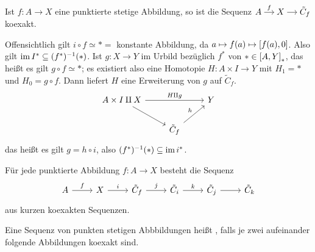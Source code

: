 \begin{satz}
	Ist $f \colon A \to X$ eine punktierte stetige Abbildung, so ist die Sequenz \(
		\begin{tikzcd}[sep=small,cramped]
			A \rar["f"] & X \rar & \tilde{C}_f
		\end{tikzcd}
	\) koexakt.
\end{satz}
\begin{beweis}
	Offensichtlich gilt $i \circ f \simeq * =$ konstante Abbildung, da $a \mapsto f(a) \mapsto \benbrace*{f(a),0}$.
	Also gilt $\im I^* \subseteq (f^*)^{-1}(*)$.
	Ist $g \colon X \to Y$ im Urbild bezüglich $f^*$ von $* \in \benbrace*{A,Y}_*$, das heißt es gilt $g \circ f \simeq *$; es existiert also eine Homotopie $H \colon A \times I \to Y$ mit $H_1 = *$ und $H_0= g \circ f$.
	Dann liefert $H$ eine Erweiterung von $g$ auf $\tilde{C}_f$.
	\[
		\begin{tikzcd}
			A \times I \amalg X \ar[rr,"H \amalg g"] \drar & & Y \\
			& \tilde{C}_f \urar["h"]
		\end{tikzcd}
	\]
	das heißt es gilt $g = h \circ i$, also $(f^*)^{-1}(*) \subseteq \im i^*$.
\end{beweis}

\begin{korollar}
	Für jede punktierte Abbildung $f \colon A \to X$ besteht die Sequenz
	\[
		\begin{tikzcd}
			A \rar["f"] & X \rar["i"] & \tilde{C}_f \rar["j"] & \tilde{C}_i \rar["k"] & \tilde{C}_j \rar & \tilde{C}_k
		\end{tikzcd}
	\]
	aus kurzen koexakten Sequenzen.
\end{korollar}

\begin{definition}
	Eine Sequenz von punkten stetigen Abbbildungen heißt , falls je zwei aufeinander folgende Abbildungen koexakt sind. 
\end{definition}

